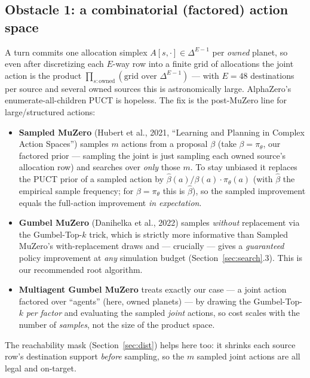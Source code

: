 \documentclass[11pt]{article}
\newcommand{\pol}{\pi_\theta}
\begin{document}
\subsection{Obstacle 1: a combinatorial (factored) action space}
A turn commits one allocation simplex $A[s,\cdot]\in\Delta^{E-1}$ per \emph{owned} planet, so even
after discretizing each $E$-way row into a finite grid of allocations the joint action is the product
$\prod_{s:\text{owned}}(\text{grid over }\Delta^{E-1})$ --- with $E{=}48$ destinations per source and
several owned sources this is astronomically large. AlphaZero's enumerate-all-children PUCT is hopeless.
The fix is the post-MuZero line for large/structured actions:
\begin{itemize}[nosep]
\item \textbf{Sampled MuZero} (Hubert et al., 2021, ``Learning and Planning in Complex Action Spaces'')
samples $m$ actions from a proposal $\beta$ (take $\beta=\pol$, our factored prior --- sampling the joint
is just sampling each owned source's allocation row) and searches over \emph{only} those $m$.
To stay unbiased it replaces the
PUCT prior of a sampled action by $\hat\beta(a)/\beta(a)\cdot\pol(a)$ (with $\hat\beta$ the empirical
sample frequency; for $\beta=\pol$ this is $\hat\beta$), so the sampled improvement equals the
full-action improvement \emph{in expectation}.
\item \textbf{Gumbel MuZero} (Danihelka et al., 2022) samples \emph{without} replacement via the
Gumbel-Top-$k$ trick, which is strictly more informative than Sampled MuZero's with-replacement draws and
--- crucially --- gives a \emph{guaranteed} policy improvement at \emph{any} simulation budget
(Section~\ref{sec:search}.3). This is our recommended root algorithm.
\item \textbf{Multiagent Gumbel MuZero} treats exactly our case --- a joint action factored over
``agents'' (here, owned planets) --- by drawing the Gumbel-Top-$k$ \emph{per factor} and evaluating the
sampled \emph{joint} actions, so cost scales with the number of \emph{samples}, not the size of the
product space.
\end{itemize}
The reachability mask (Section~\ref{sec:dist}) helps here too: it shrinks each source row's
destination support \emph{before} sampling, so the $m$ sampled joint actions are all legal and
on-target.
\end{document}
